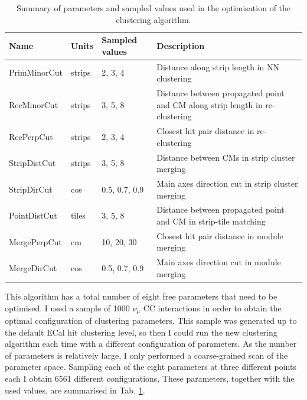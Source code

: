 \begin{table}[h!]
	\centering
	\caption{Summary of parameters and sampled values used in the optimisation of the clustering algorithm.}
	\begin{tabular}{l|l|l|p{7cm}}
		Name         & Units  & Sampled values & Description                                                                  \\ \hline
		PrimMinorCut & strips & 2, 3, 4        & Distance along strip length in NN clustering                                 \\
		RecMinorCut  & strips & 3, 5, 8        & Distance between propagated point and CM along strip length in re-clustering \\
		RecPerpCut   & strips & 2, 3, 4        & Closest hit pair distance in re-clustering                                   \\
		StripDistCut & strips & 3, 5, 8        & Distance between CMs in strip cluster merging                                \\
		StripDirCut  & cos    & 0.5, 0.7, 0.9  & Main axes direction cut in strip cluster merging                             \\
		PointDistCut & tiles  & 3, 5, 8        & Distance between propagated point and CM in strip-tile matching              \\
		MergePerpCut & cm     & 10, 20, 30     & Closest hit pair distance in module merging                                  \\
		MergeDirCut  & cos    & 0.5, 0.7, 0.9  & Main axes direction cut in module merging                                   
	\end{tabular}
	\label{tab:clustering_optimisation}
\end{table}

This algorithm has a total number of eight free parameters that need to be optimised. I used a sample of 1000 $\nu_{\mu}$ CC interactions in order to obtain the optimal configuration of clustering parameters. This sample was generated up to the default ECal hit clustering level, so then I could run the new clustering algorithm each time with a different configuration of parameters. As the number of parameters is relatively large, I only performed a coarse-grained scan of the parameter space. Sampling each of the eight parameters at three different points each I obtain 6561 different configurations. These parameters, together with the used values, are summarised in Tab. \ref{tab:clustering_optimisation}.

